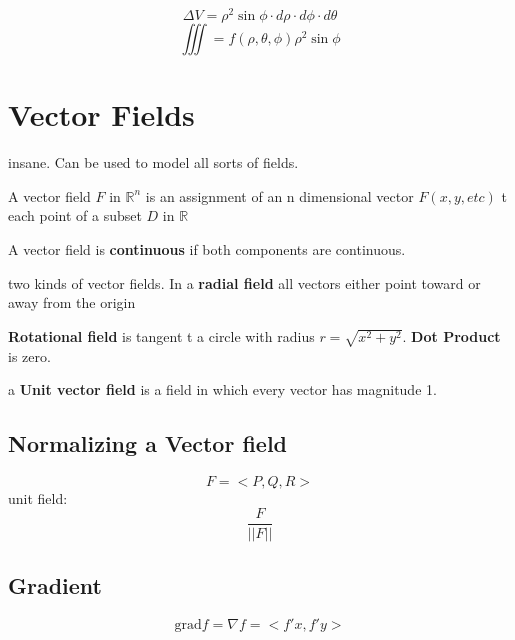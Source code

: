 \begin{equation}
	\label{}	
	\Delta V=\rho^{2} \sin\phi\cdot d\rho\cdot d\phi\cdot d\theta
\end{equation}
\begin{equation}
	\label{}
\iiint=f(\rho,\theta,\phi)\rho^{2}\sin\phi
\end{equation}

\section{Vector Fields}

insane. Can be used to model all sorts of fields. 



A vector field $F$ in $\mathbb{R}^{n}$ is an assignment of an n dimensional vector $F(x,y,etc)$ t each point of a subset $D$ in $\mathbb{R}$

A vector field is \textbf{continuous} if both components are continuous. 

\hfill

two kinds of vector fields. In a \textbf{radial field} all vectors either point toward or away from the origin

\hfill

\textbf{Rotational field} is tangent t a circle with radius $r=\sqrt{x^{2}+y^{2}}$. \textbf{Dot Product} is zero.

\hfill
\hfill

a \textbf{Unit vector field} is a field in which every vector has magnitude 1. 

\subsection{Normalizing a Vector field}

\begin{equation}
	\label{}
	F=<P,Q,R>
\end{equation}
unit field:
\begin{equation}
	\label{}
	\frac{F}{||F||}
\end{equation}

\subsection{Gradient}

\begin{equation}
	\label{}
	\mbox{grad}f=\nabla f=<f'x,f'y>	
\end{equation}


